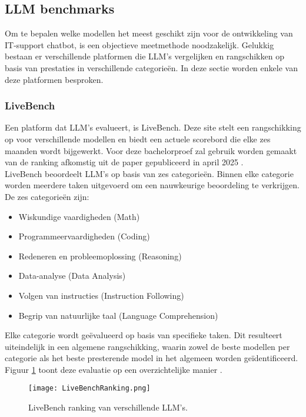 \subsection{LLM benchmarks}
Om te bepalen welke modellen het meest geschikt zijn voor de ontwikkeling van IT-support chatbot, is een objectieve meetmethode noodzakelijk. Gelukkig bestaan er verschillende platformen die LLM's vergelijken en rangschikken op basis van prestaties in verschillende categorieën. In deze sectie worden enkele van deze platformen besproken.
   
\subsubsection{LiveBench} 
Een platform dat LLM's evalueert, is LiveBench. Deze site stelt een rangschikking op voor verschillende modellen en biedt een actuele scorebord die elke zes maanden wordt bijgewerkt. Voor deze bachelorproef zal gebruik worden gemaakt van de ranking afkomstig uit de paper gepubliceerd in april 2025 \autocite{livebench}.
\\[1em]
LiveBench beoordeelt LLM's op basis van zes categorieën. Binnen elke categorie worden meerdere taken uitgevoerd om een nauwkeurige beoordeling te verkrijgen. De zes categorieën zijn:
\begin{itemize}
    \item Wiskundige vaardigheden (Math)
    \item Programmeervaardigheden (Coding)
    \item Redeneren en probleemoplossing (Reasoning)
    \item Data-analyse (Data Analysis)
    \item Volgen van instructies (Instruction Following)
    \item Begrip van natuurlijke taal (Language Comprehension)
\end{itemize}

Elke categorie wordt geëvalueerd op basis van specifieke taken. Dit resulteert uiteindelijk in een algemene rangschikking, waarin zowel de beste modellen per categorie als het beste presterende model in het algemeen worden geïdentificeerd. Figuur \ref{fig:livebench} toont deze evaluatie op een overzichtelijke manier \autocite{livebench}.

\begin{figure}[H]
    \centering
    \texttt{[image: LiveBenchRanking.png]}
    \caption{LiveBench ranking van verschillende LLM's.}
    \label{fig:livebench}
\end{figure}

